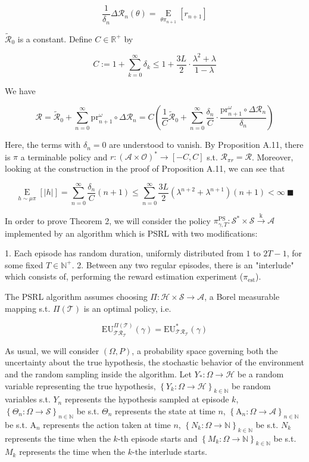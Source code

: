 \documentclass[a4paper]{article}
\newcommand{\AP}[1]{\left(#1\right)}
\newcommand{\AB}[1]{\left[#1\right]}
\newcommand{\AC}[1]{\left\{#1\right\}}
\newcommand{\Abs}[1]{\left\vert #1 \right\vert}
\newcommand{\Ea}[2]{\underset{#1}{\operatorname{E}}\AB{#2}}
\newcommand{\Nats}{\mathbb{N}}
\newcommand{\Reals}{\mathbb{R}}
\newcommand{\K}{\xrightarrow{\mathrm{k}}}
\newcommand{\St}{\mathcal{S}}
\newcommand{\A}{\mathcal{A}}
\newcommand{\Ob}{\mathcal{O}}
\newcommand{\AO}{\AP{\A\times\Ob}}
\newcommand{\FH}{\AO^*}
\newcommand{\R}{\mathcal{R}}
\newcommand{\T}{\mathcal{T}}
\newcommand{\Hy}{\mathcal{H}}
\newcommand{\Prj}{\mathrm{pr}}
\newcommand{\Est}{\mathrm{est}}
\newcommand{\EU}{\mathrm{EU}}
\newcommand{\PSR}{\text{PS}}
\newcommand{\THy}{Y_*}
\newcommand{\SHy}{Y}
\newcommand{\AT}{\mathrm{A}}
\newcommand{\ET}{N}
\newcommand{\IT}{M}
\begin{document}
$$\frac{1}{\delta_n}\Delta\R_n(\theta)=\Ea{\theta\pi_{n+1}}{r_{n+1}}$$

$\tilde{\R}_0$ is a constant. Define $C\in\Reals^+$ by 

$$C:=1+\sum_{k=0}^\infty\delta_k\leq1+\frac{3L}{2}\cdot\frac{\lambda^2+\lambda}{1-\lambda}$$

We have

$$\R=\tilde{\R}_{0}+\sum_{n=0}^\infty\Prj^\omega_{n+1}\circ\Delta\R_n=C\AP{\frac{1}{C}\tilde{\R}_{0}+\sum_{n=0}^\infty\frac{\delta_n}{C}\cdot\frac{\Prj^\omega_{n+1}\circ\Delta\R_n}{\delta_n}}$$

Here, the terms with $\delta_n=0$ are understood to vanish. By Proposition A.11, there is  $\pi$ a terminable policy and $r:\FH\rightarrow[-C,C]$ s.t. $\R_{\pi r}= \R$. Moreover, looking at the construction in the proof of Proposition A.11, we can see that

$$\Ea{h\sim\mu\pi}{\Abs{h}} = \sum_{n=0}^\infty \frac{\delta_n}{C}(n+1)\leq\sum_{n=0}^\infty\frac{3L}{2}\AP{\lambda^{n+2}+\lambda^{n+1}}(n+1)<\infty\ \blacksquare$$

In order to prove Theorem 2, we will consider the policy $\pi_{\gamma,T}^{\PSR}: \St^*\times\St\K\A$ implemented by an algorithm which is PSRL with two modifications:

1. Each episode has random duration, uniformly distributed from $1$ to $2T-1$, for some fixed $T\in\Nats^+$.
2. Between any two regular episodes, there is an "interlude" which consists of, performing the reward estimation experiment ($\pi_\Est$).

The PSRL algorithm assumes choosing $\Pi:\Hy\times\St\rightarrow\A$, a Borel measurable mapping s.t. $\Pi(\T)$ is an optimal policy, i.e.

$$\EU^{\Pi(\T)}_{\T\R_\T}(\gamma)=\EU^{*}_{\T\R_\T}(\gamma)$$

As usual, we will consider $(\Omega,P)$, a probability space governing both the uncertainty about the true hypothesis, the stochastic behavior of the environment and the random sampling inside the algorithm. Let $\THy:\Omega\rightarrow\Hy$ be a random variable representing the true hypothesis, $\AC{\SHy_k:\Omega\rightarrow\Hy}_{k\in\Nats}$ be random variables s.t. $\SHy_n$ represents the hypothesis sampled at episode $k$, $\AC{\Theta_n:\Omega\rightarrow\St}_{n\in\Nats}$ be s.t. $\Theta_n$ represents the state at time $n$, $\AC{\AT_n:\Omega\rightarrow\A}_{n\in\Nats}$ be s.t. $\AT_n$ represents the action taken at time $n$, $\AC{\ET_k:\Omega\rightarrow\Nats}_{k\in\Nats}$ be s.t. $\ET_{k}$ represents the time when the $k$-th episode starts and $\AC{\IT_k:\Omega\rightarrow\Nats}_{k\in\Nats}$ be s.t. $\IT_k$ represents the time when the $k$-the interlude starts.
\end{document}
